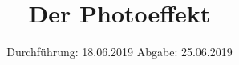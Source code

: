 

\subject{V500}
\title{Der Photoeffekt}
\date{%
  Durchführung: 18.06.2019
  \hspace{3em}
  Abgabe: 25.06.2019
}



\maketitle
\thispagestyle{empty}
\tableofcontents
\newpage






\printbibliography{}


